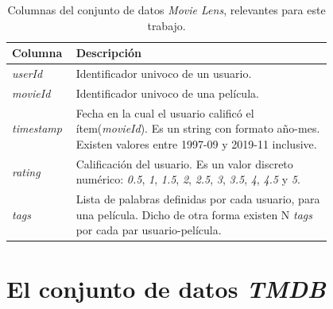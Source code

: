 \documentclass[11pt,a4paper,twoside]{thesis}
\begin{document}
\begin{table}[!htb]
	\centering
	\footnotesize
	\begin{tabular}{l | p{0.8\linewidth}}
		\hline
		Columna            & Descripción                                                                                                                                                                                 \\
		\hline
		\textit{userId}    & Identificador univoco de un usuario.                                                                                                                                                        \\
		\textit{movieId}   & Identificador univoco de una película.                                                                                                                                                      \\
		\textit{timestamp} & Fecha en la cual el usuario calificó el ítem(\textit{movieId}). Es un string con formato año-mes. Existen valores entre 1997-09 y 2019-11 inclusive.                                        \\
		\textit{rating}    & Calificación del usuario. Es un valor discreto numérico: \textit{0.5}, \textit{1}, \textit{1.5}, \textit{2}, \textit{2.5}, \textit{3}, \textit{3.5}, \textit{4}, \textit{4.5} y \textit{5}. \\
		\textit{tags}      & Lista de palabras definidas por cada usuario, para una película. Dicho de otra forma existen N \textit{tags} por cada par usuario-película.                                                 \\
		\hline
	\end{tabular}
	\caption{
		Columnas del conjunto de datos \textit{Movie Lens}, relevantes para este trabajo.
	}
	\label{table:movieLensColumns}
\end{table}

\clearpage

\section{El conjunto de datos \textit{TMDB}}
\end{document}

